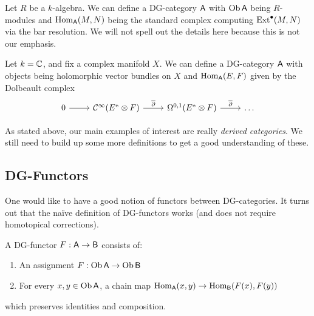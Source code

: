 \documentclass{amsart}
\begin{document}
\begin{ex}
Let $R$ be a $k$-algebra.
We can define a DG-category $\mathsf{A}$ with $\operatorname{Ob} \mathsf{A}$ being $R$-modules and $\operatorname{Hom}_{\mathsf{A}}(M, N)$ being the standard complex computing $\operatorname{Ext}^\bullet(M, N)$ via the bar resolution.
We will not spell out the details here because this is not our emphasis.
\end{ex}

\begin{ex}
Let $k = \mathbb{C}$, and fix a complex manifold $X$.
We can define a DG-category $\mathsf{A}$ with objects being holomorphic vector bundles on $X$ and $\operatorname{Hom}_{\mathsf{A}}(E, F)$ given by the Dolbeault complex
\[
\begin{tikzcd}
0 \rar & \Cc^\infty(E^* \otimes F) \rar["\ol{\partial}"] & \Omega^{0,1}(E^* \otimes F) \rar["\ol{\partial}"] & \dots
\end{tikzcd}
\]
\end{ex}

As stated above, our main examples of interest are really \emph{derived categories}.
We still need to build up some more definitions to get a good understanding of these.

\subsection{DG-Functors}

One would like to have a good notion of functors between DG-categories.
It turns out that the na\"ive definition of DG-functors works (and does not require homotopical corrections).

\begin{dfn}
A DG-functor $F: \mathsf{A} \to \mathsf{B}$ consists of:
\begin{enumerate}
\item An assignment $F: \operatorname{Ob} \mathsf{A} \to \operatorname{Ob} \mathsf{B}$
\item For every $x, y \in \operatorname{Ob} \mathsf{A}$, a chain map $\operatorname{Hom}_{\mathsf{A}}(x, y) \to \operatorname{Hom}_{\mathsf{B}}(F(x), F(y))$
\end{enumerate}
which preserves identities and composition.
\end{dfn}
\end{document}
